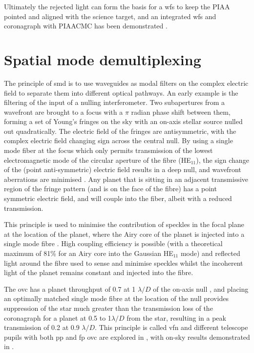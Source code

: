 \documentclass[letterpaper]{ar-1col}
\newcommand{\ld}{$\lambda/D$}
\begin{document}
Ultimately the rejected light can form the basis for a \ac{wfs} to keep the PIAA pointed and aligned with the science target, and an integrated \ac{wfs} and coronagraph with PIAACMC has been demonstrated \citep{Haffert23a}.


\section{Spatial mode demultiplexing}

The principle of \ac{smd} is to use waveguides as modal filters on the complex electric field to separate them into different optical pathways.
%
An early example is the filtering of the input of a nulling interferometer.
%
Two subapertures from a wavefront are brought to a focus with a $\pi$ radian phase shift between them, forming a set of Young's fringes on the sky with an on-axis stellar source nulled out quadratically.
%
The electric field of the fringes are antisymmetric, with the complex electric field changing sign across the central null.
%
By using a single mode fiber at the focus  which only permits transmission of the lowest electromagnetic mode of the circular aperture of the fibre (HE$_{11}$), the sign change of the (point anti-symmetric) electric field results in a deep null, and wavefront aberrations are minimised \citet{Serabyn06,Haguenauer06}.
%
Any planet that is sitting in an adjacent transmissive region of the fringe pattern (and is on the face of the fibre) has a point symmetric electric field, and will couple into the fiber, albeit with a reduced transmission.

This principle is used to minimise the contribution of speckles in the focal plane at the location of the planet, where the Airy core of the planet is injected into a single mode fibre \citep{Mawet17}.
%
High coupling efficiency is possible (with a theoretical maximum of 81\% for an Airy core into the Gaussian HE$_{11}$ mode) and reflected light around the fibre used to sense and minimise speckles whilst the incoherent light of the planet remains constant and injected into the fibre.

The \ac{ovc} has a planet throughput of 0.7 at 1 \ld{} of the on-axis null \citep{Mawet05b}, and placing an optimally matched single mode fibre at the location of the null provides suppression of the star much greater than the transmission loss of the coronagraph for a planet at 0.5 to 1\ld{} from the star, resulting in a peak transmission of 0.2 at 0.9 \ld{}.
%
This principle is called \acl{vfn} \citep[\acs{vfn}; ][]{Ruane18} and different telescope pupils with both \ac{pp} and \ac{fp} \ac{ovc} are explored in \citet{Ruane19}, with on-sky results demonstrated in \citet{Echeverri24}.
\end{document}
